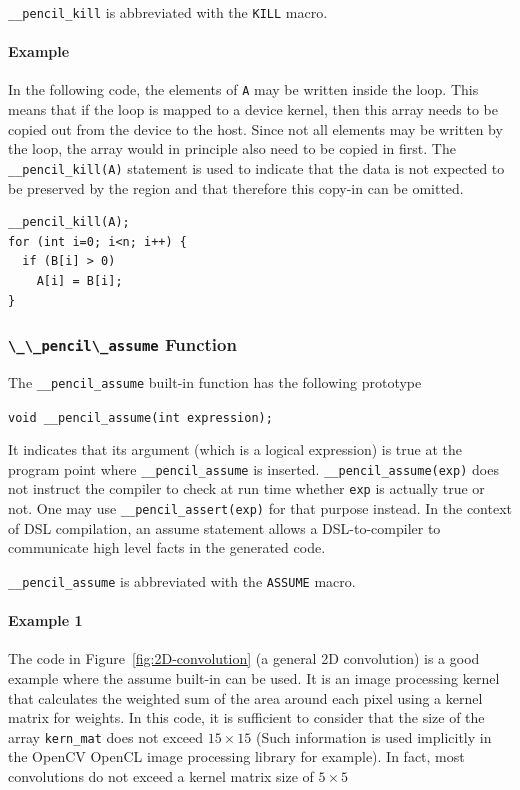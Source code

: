   \lstinline!__pencil_kill! is abbreviated with the \lstinline!KILL! macro.

\paragraph{Example}
  In the following code, the elements of \lstinline!A!
  may be written inside the loop.  This means that if the loop
  is mapped to a device kernel, then this array needs to be copied
  out from the device to the host.  Since not all elements may be
  written by the loop, the array would in principle also need to
  be copied in first.  The \lstinline!__pencil_kill(A)! statement
  is used to indicate that the data is not expected to be preserved
  by the region and that therefore this copy-in can be omitted.

\begin{lstlisting}[language=pencil]
__pencil_kill(A);
for (int i=0; i<n; i++) {
  if (B[i] > 0)
    A[i] = B[i];
}
\end{lstlisting}

\subsubsection{\lstinline!\_\_pencil\_assume! Function}


The \lstinline!__pencil_assume! built-in function has the following prototype

  \lstinline!void __pencil_assume(int expression);!

  It indicates that its argument (which is a logical expression) is true at
  the program point where \lstinline!__pencil_assume! is inserted.
  \lstinline!__pencil_assume(exp)! does not instruct the compiler to check at
  run time whether \lstinline!exp! is actually true or not.
  One may use \lstinline!__pencil_assert(exp)! for that purpose instead.
  In the context of DSL compilation, an assume statement allows a
  DSL-to-\pencil compiler to communicate high level facts in the generated
  code.

  \lstinline!__pencil_assume! is abbreviated with the \lstinline!ASSUME! macro.
  
\paragraph{Example 1}
The code in Figure~\ref{fig:2D-convolution} (a general 2D convolution)  is a
good example where the assume built-in can be used.  It is an image
processing kernel that calculates the weighted sum of the area around each
pixel using a kernel matrix for weights.
In this code, it is sufficient to consider that the size of the array
\lstinline!kern_mat! does not exceed $15\times15$ (Such information is
used implicitly in the OpenCV OpenCL image processing library for example).
In fact, most convolutions do not exceed a kernel matrix size of $5\times5$

